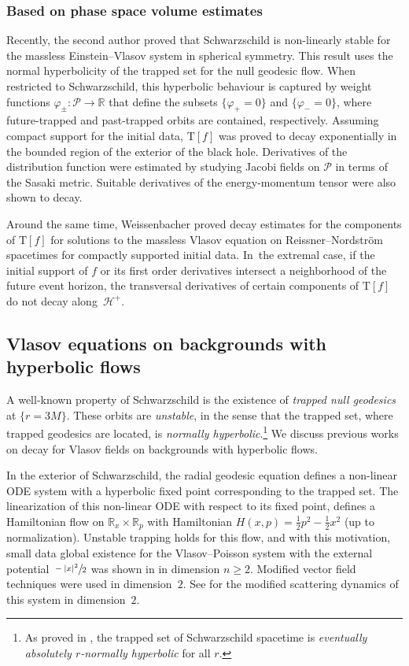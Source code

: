 \documentclass[JEP,XML,SOM,Unicode,published]{cedram}
\theoremstyle{plain}
\theoremstyle{definition}
\newcommand\R{{\mathbb{R}}}
\renewcommand\H{{\mathcal{H}^+}}
\begin{document}
\subsubsection{Based on phase space volume estimates} Recently, the second author \cite{VR23} proved that Schwarzschild is non-linearly stable for the massless Einstein--Vlasov system in spherical symmetry. This result uses the normal hyperbolicity of the trapped set for the null geodesic flow. When restricted to Schwarzschild, this hyperbolic behaviour is captured by weight functions $\varphi_{\pm}\colon \mathcal{P}\to \R$ that define the subsets $\{\varphi_{+}=0\}$ and $\{\varphi_{-}=0\}$, where future-trapped and past-trapped orbits are contained, respectively. Assuming compact support for the initial data, $\mathrm{T}[f]$ was proved to decay exponentially in the bounded region of the exterior of the black hole. Derivatives of the distribution function were estimated by studying Jacobi fields on $\mathcal{P}$ in terms of the Sasaki metric. Suitable derivatives of the energy-momentum tensor were also shown to decay.

Around the same time, Weissenbacher \cite{W23} proved decay estimates for the components of $\mathrm{T}[f]$ for solutions to the massless Vlasov equation on Reissner--Nordström spacetimes for compactly supported initial data. In~the extremal case, if the initial support of $f$ or its first order derivatives intersect a neighborhood of the future event horizon, the transversal derivatives of certain components of $\mathrm{T}[f]$ do not decay along~$\H$.

\subsection{Vlasov equations on backgrounds with hyperbolic flows}

A well-known property of Schwarzschild is the existence of \emph{trapped null geodesics} at $\{r=3M\}$. These orbits are \emph{unstable}, in the sense that the trapped set, where trapped geodesics are located, is \emph{normally hyperbolic}.\footnote{As proved in \cite[\S2]{WZ11}, the trapped set of Schwarzschild spacetime is \textit{eventually absolutely $r$-normally hyperbolic} for all $r$.} We discuss previous works on decay for Vlasov fields on backgrounds with hyperbolic flows.

In the exterior of Schwarzschild, the radial geodesic equation defines a non-linear ODE system with a hyperbolic fixed point corresponding to the trapped set. The linearization of this non-linear ODE with respect to its fixed point, defines a Hamiltonian flow on $\R_x\times \R_p$ with Hamiltonian $H(x,p)=\frac{1}{2}p^2-\frac{1}{2}x^2$ (up to normalization). Unstable trapping holds for this flow, and with this motivation, small data global existence for the Vlasov--Poisson system with the external potential $\sfrac{-|x|^2}{2}$ was shown in \cite{VV24} in dimension $n\geq 2$. Modified vector field techniques were used in dimension~$2$. See \cite{BVV23} for the modified scattering dynamics of this system in dimension~$2$.
\end{document}
